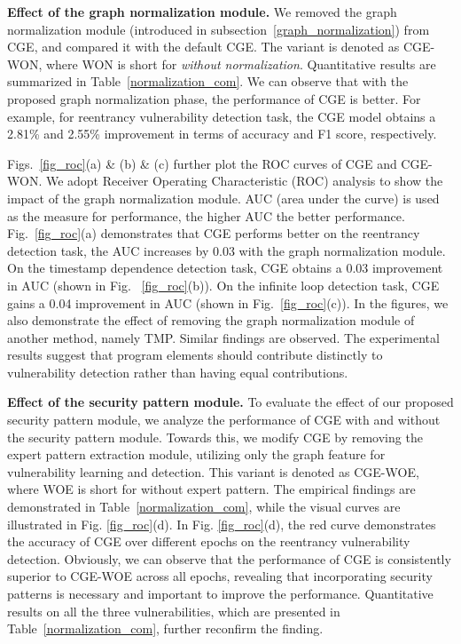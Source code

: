 \textbf{Effect of the graph normalization module.} We removed the graph normalization module (introduced in subsection~\ref{graph_normalization}) from CGE, and compared it with the default CGE. The variant is denoted as CGE-WON, where WON is short for \emph{without normalization}. Quantitative results are summarized in Table~\ref{normalization_com}. We can observe that with the proposed graph normalization phase, the performance of CGE is better. For example, for reentrancy vulnerability detection task, the CGE model obtains a 2.81\% and 2.55\% improvement in terms of accuracy and F1 score, respectively.

Figs.~\ref{fig_roc}(a) \& (b) \& (c) further plot the ROC curves of CGE and CGE-WON. We adopt Receiver Operating Characteristic (ROC) analysis to show the impact of the graph normalization module. AUC (area under the curve) is used as the measure for performance, the higher AUC the better performance. Fig.~\ref{fig_roc}(a) demonstrates that CGE performs better on the reentrancy detection task, the AUC increases by 0.03 with the graph normalization module. On the timestamp dependence detection task, CGE obtains a 0.03 improvement in AUC (shown in Fig. ~\ref{fig_roc}(b)). On the infinite loop detection task, CGE gains a 0.04 improvement in AUC (shown in Fig.~\ref{fig_roc}(c)). In the figures, we also demonstrate the effect of removing the graph normalization module of another method, namely TMP. Similar findings are observed. The experimental results suggest that program elements should contribute distinctly to vulnerability detection rather than having equal contributions.

\textbf{Effect of the security pattern module.} To evaluate the effect of our proposed security pattern module, we analyze the performance of CGE with and without the security pattern module. Towards this, we modify CGE by removing the expert pattern extraction module, utilizing only the graph feature for vulnerability learning and detection. This variant is denoted as CGE-WOE, where WOE is short for without expert pattern. The empirical findings are demonstrated in Table~\ref{normalization_com}, while the visual curves are illustrated in Fig. \ref{fig_roc}(d). In Fig. \ref{fig_roc}(d), the red curve demonstrates the accuracy of CGE over different epochs on the reentrancy vulnerability detection. Obviously, we can observe that the performance of CGE is consistently superior to CGE-WOE across all epochs, revealing that incorporating security patterns is necessary and important to improve the performance. Quantitative results on all the three vulnerabilities, which are presented in Table~\ref{normalization_com}, further reconfirm the finding. 

